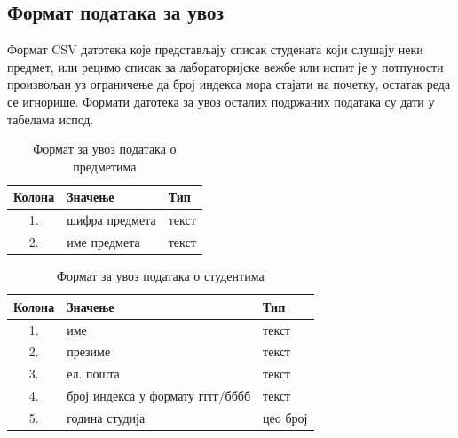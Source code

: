 \documentclass[a4paper, 12pt, diplomski]{etfcyr}
\begin{document}
			\subsection{Формат података за увоз}
				\begin{justify}
					Формат CSV датотека које представљају списак студената који слушају неки предмет, или рецимо списак за лабораторијске вежбе или испит је у потпуности произвољан уз ограничење да број индекса мора стајати на почетку, остатак реда се игнорише.
					Формати датотека за увоз осталих подржаних података су дати у табелама испод.
				\end{justify}
				\begin{table}[H]
					\centering
					\begin{tabular}{ c l l }
						Колона & Значење & Тип \\
						\hline
						1. & шифра предмета & текст \\
						2. & име предмета & текст \\
					\end{tabular}
					\caption{Формат за увоз података о предметима}
					\label{table:2}
				\end{table}
				\begin{table}[H]
					\centering
					\begin{tabular}{ c l l }
						Колона & Значење & Тип \\
						\hline
						1. & име & текст \\
						2. & презиме & текст \\
						3. & ел. пошта & текст \\
						4. & број индекса у формату гггг/бббб & текст \\
						5. & година студија & цео број \\
					\end{tabular}
					\caption{Формат за увоз података о студентима}
					\label{table:3}
				\end{table}

			\newpage
\end{document}
